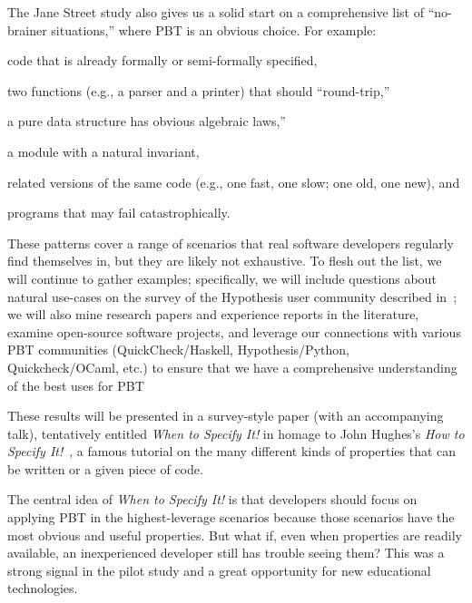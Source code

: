 The Jane Street study also gives us a solid start on a comprehensive list of
``no-brainer situations,'' where PBT is an obvious choice. For example:
\begin{enumerate*}[label=(\arabic{enumi})]
\item code that is already formally or semi-formally specified,
\item two functions (e.g., a parser and a printer) that should ``round-trip,''
\item a pure data structure has obvious algebraic laws,''
\item a module with a natural invariant,
\item related versions of the same code (e.g., one fast, one slow; one old, one
new),
and
\item programs that may fail catastrophically.
\end{enumerate*}
These patterns cover a range of
scenarios that real software developers regularly find themselves in, but they
are likely not exhaustive. To flesh out the list, we will continue to
gather examples; specifically, we will include
questions about natural use-cases on the survey of the Hypothesis user
community described in~; we will also mine
research papers and experience reports in the literature,
examine open-source software projects, and leverage our connections with various
PBT communities (QuickCheck/Haskell, Hypothesis/Python, Quickcheck/OCaml, etc.)
to ensure that we have a comprehensive understanding of the best uses for PBT

These results will be presented in a survey-style paper (with an
accompanying talk), tentatively entitled {\em When to Specify It!} in
homage to John Hughes's {\em How to Specify
  It!}~\cite{HowToSpecifyIt}, a famous tutorial on the many different
kinds of properties that can be written or a given piece of code.


The central idea of {\em When to Specify It!} is that developers should focus on
applying PBT in the highest-leverage scenarios because those scenarios have the
most obvious and useful properties. But what if, even when properties are
readily available, an inexperienced developer still has trouble seeing them?
This was a strong signal in the pilot study and a great opportunity for new
educational technologies.

